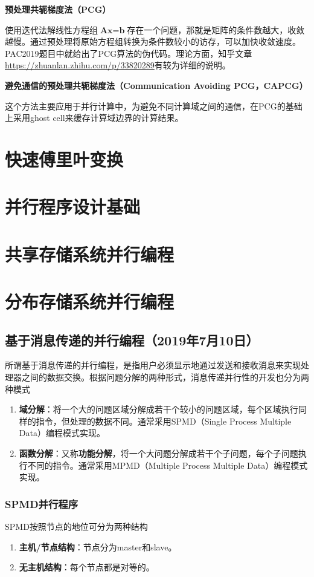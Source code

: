 \documentclass{article}
\begin{document}
					\textbf{预处理共轭梯度法（PCG）}
					
					使用迭代法解线性方程组$\textbf{A}\textbf{x}=\textbf{b}$存在一个问题，那就是矩阵的条件数越大，收敛越慢。通过预处理将原始方程组转换为条件数较小的访存，可以加快收敛速度。PAC2019题目中就给出了PCG算法的伪代码。理论方面，知乎文章\url{https://zhuanlan.zhihu.com/p/33820289}有较为详细的说明。
					
					\textbf{避免通信的预处理共轭梯度法（Communication Avoiding PCG，CAPCG）}
					
					这个方法主要应用于并行计算中，为避免不同计算域之间的通信，在PCG的基础上采用ghost cell来缓存计算域边界的计算结果。
		\section{快速傅里叶变换}
		\section{并行程序设计基础}
		\section{共享存储系统并行编程}
		\section{分布存储系统并行编程}
			\subsection{基于消息传递的并行编程（2019年7月10日）}
				所谓基于消息传递的并行编程，是指用户必须显示地通过发送和接收消息来实现处理器之间的数据交换。根据问题分解的两种形式，消息传递并行性的开发也分为两种模式
				\begin{enumerate}
					\item \textbf{域分解}：将一个大的问题区域分解成若干个较小的问题区域，每个区域执行同样的指令，但处理的数据不同。通常采用SPMD（Single Process Multiple Data）编程模式实现。
					\item \textbf{函数分解}：又称\textbf{功能分解}，将一个大问题分解成若干个子问题，每个子问题执行不同的指令。通常采用MPMD（Multiple Process Multiple Data）编程模式实现。
				\end{enumerate}
				\subsubsection{SPMD并行程序}
					SPMD按照节点的地位可分为两种结构
					\begin{enumerate}
						\item \textbf{主机/节点结构}：节点分为master和slave。
						\item \textbf{无主机结构}：每个节点都是对等的。
					\end{enumerate}
\end{document}
